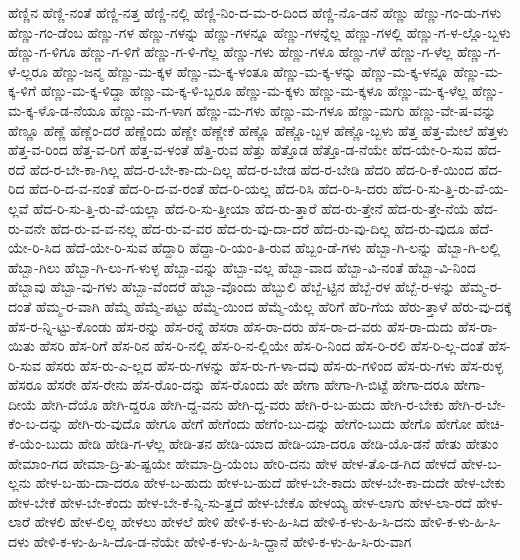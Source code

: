 {ಹೆಣ್ಣಿನ
ಹೆಣ್ಣಿ-ನಂತೆ
ಹೆಣ್ಣಿ-ನತ್ತ
ಹೆಣ್ಣಿ-ನಲ್ಲಿ
ಹೆಣ್ಣಿ-ನಿಂ-ದ-ಮ-ರ-ದಿಂದ
ಹೆಣ್ಣಿ-ನೊ-ಡನೆ
ಹೆಣ್ಣು
ಹೆಣ್ಣು-ಗಂ-ಡು-ಗಳು
ಹೆಣ್ಣು-ಗಂ-ಡೆಂಬ
ಹೆಣ್ಣು-ಗಳ
ಹೆಣ್ಣು-ಗಳನ್ನು
ಹೆಣ್ಣು-ಗಳನ್ನೂ
ಹೆಣ್ಣು-ಗಳನ್ನೆಲ್ಲ
ಹೆಣ್ಣು-ಗಳಲ್ಲಿ
ಹೆಣ್ಣು-ಗ-ಳ-ಲ್ಲೊ-ಬ್ಬಳು
ಹೆಣ್ಣು-ಗ-ಳಿಗೂ
ಹೆಣ್ಣು-ಗ-ಳಿಗೆ
ಹೆಣ್ಣು-ಗ-ಳಿ-ಗೆಲ್ಲ
ಹೆಣ್ಣು-ಗಳು
ಹೆಣ್ಣು-ಗಳೂ
ಹೆಣ್ಣು-ಗಳೆ
ಹೆಣ್ಣು-ಗ-ಳೆಲ್ಲ
ಹೆಣ್ಣು-ಗ-ಳೆ-ಲ್ಲರೂ
ಹೆಣ್ಣು-ಜನ್ಮ
ಹೆಣ್ಣು-ಮ-ಕ್ಕಳ
ಹೆಣ್ಣು-ಮ-ಕ್ಕ-ಳಂತೂ
ಹೆಣ್ಣು-ಮ-ಕ್ಕ-ಳನ್ನು
ಹೆಣ್ಣು-ಮ-ಕ್ಕ-ಳನ್ನೂ
ಹೆಣ್ಣು-ಮ-ಕ್ಕ-ಳಿಗೆ
ಹೆಣ್ಣು-ಮ-ಕ್ಕ-ಳಿದ್ದಾ
ಹೆಣ್ಣು-ಮ-ಕ್ಕ-ಳಿ-ಬ್ಬರೂ
ಹೆಣ್ಣು-ಮ-ಕ್ಕಳು
ಹೆಣ್ಣು-ಮ-ಕ್ಕಳೂ
ಹೆಣ್ಣು-ಮ-ಕ್ಕ-ಳೆಲ್ಲ
ಹೆಣ್ಣು-ಮ-ಕ್ಕ-ಳೊ-ಡ-ನೆಯೂ
ಹೆಣ್ಣು-ಮ-ಗ-ಳಾಗ
ಹೆಣ್ಣು-ಮ-ಗಳು
ಹೆಣ್ಣು-ಮ-ಗಳೂ
ಹೆಣ್ಣು-ಮಗು
ಹೆಣ್ಣು-ವೇ-ಷ-ವನ್ನು
ಹೆಣ್ಣೂ
ಹೆಣ್ಣೆ
ಹೆಣ್ಣೆಂ-ದರೆ
ಹೆಣ್ಣೆಂದು
ಹೆಣ್ಣೇ
ಹೆಣ್ಣೇಕೆ
ಹೆಣ್ಣೊ
ಹೆಣ್ಣೊ-ಬ್ಬಳ
ಹೆಣ್ಣೊ-ಬ್ಬಳು
ಹೆತ್ತ
ಹೆತ್ತ-ಮೇಲೆ
ಹೆತ್ತಳು
ಹೆತ್ತ-ವ-ರಿಂದ
ಹೆತ್ತ-ವ-ರಿಗೆ
ಹೆತ್ತ-ವ-ಳಂತೆ
ಹೆತ್ತಿ-ರುವ
ಹೆತ್ತು
ಹೆತ್ತೊಡ
ಹೆತ್ತೊ-ಡ-ನೆಯೇ
ಹೆದ-ಯೇ-ರಿ-ಸುವ
ಹೆದ-ರದೆ
ಹೆದ-ರ-ಬೇ-ಕಾ-ಗಿಲ್ಲ
ಹೆದ-ರ-ಬೇ-ಕಾ-ದು-ದಿಲ್ಲ
ಹೆದ-ರ-ಬೇಡ
ಹೆದ-ರ-ಬೇಡಿ
ಹೆದರಿ
ಹೆದ-ರಿ-ಕೆ-ಯಿಂದ
ಹೆದ-ರಿದ
ಹೆದ-ರಿ-ದ-ವ-ನಂತೆ
ಹೆದ-ರಿ-ದ-ವ-ರಂತೆ
ಹೆದ-ರಿ-ಯಲ್ಲ
ಹೆದ-ರಿಸಿ
ಹೆದ-ರಿ-ಸಿ-ದರು
ಹೆದ-ರಿ-ಸು-ತ್ತಿ-ರು-ವೆ-ಯ-ಲ್ಲವೆ
ಹೆದ-ರಿ-ಸು-ತ್ತಿ-ರು-ವೆ-ಯಲ್ಲಾ
ಹೆದ-ರಿ-ಸು-ತ್ತೀಯಾ
ಹೆದ-ರು-ತ್ತಾರೆ
ಹೆದ-ರು-ತ್ತೇನೆ
ಹೆದ-ರು-ತ್ತೇ-ನೆಯೆ
ಹೆದ-ರು-ವನೇ
ಹೆದ-ರು-ವ-ವ-ನಲ್ಲ
ಹೆದ-ರು-ವ-ವರ
ಹೆದ-ರು-ವು-ದಾ-ದರೆ
ಹೆದ-ರು-ವು-ದಿಲ್ಲ
ಹೆದ-ರು-ವುದೂ
ಹೆದೆ-ಯೇ-ರಿ-ಸಿದ
ಹೆದೆ-ಯೇ-ರಿ-ಸುವ
ಹೆದ್ದಾರಿ
ಹೆದ್ದಾ-ರಿ-ಯಂ-ತಿ-ರುವ
ಹೆಬ್ಬಂ-ಡೆ-ಗಳು
ಹೆಬ್ಬಾ-ಗಿ-ಲನ್ನು
ಹೆಬ್ಬಾ-ಗಿ-ಲಲ್ಲಿ
ಹೆಬ್ಬಾ-ಗಿಲು
ಹೆಬ್ಬಾ-ಗಿ-ಲು-ಗ-ಳುಳ್ಳ
ಹೆಬ್ಬಾ-ವನ್ನು
ಹೆಬ್ಬಾ-ವಲ್ಲ
ಹೆಬ್ಬಾ-ವಾದ
ಹೆಬ್ಬಾ-ವಿ-ನಂತೆ
ಹೆಬ್ಬಾ-ವಿ-ನಿಂದ
ಹೆಬ್ಬಾವು
ಹೆಬ್ಬಾ-ವು-ಗಳು
ಹೆಬ್ಬಾ-ವೆಂದರೆ
ಹೆಬ್ಬಾ-ವೊಂದು
ಹೆಬ್ಬುಲಿ
ಹೆಬ್ಬೆ-ಟ್ಟಿನ
ಹೆಬ್ಬೆ-ರಳ
ಹೆಬ್ಬೆ-ರ-ಳನ್ನು
ಹೆಮ್ಮ-ರ-ದಂತೆ
ಹೆಮ್ಮ-ರ-ವಾಗಿ
ಹೆಮ್ಮೆ
ಹೆಮ್ಮೆ-ಪಟ್ಟು
ಹೆಮ್ಮೆ-ಯಿಂದ
ಹೆಮ್ಮೆ-ಯೆಲ್ಲ
ಹೆರಿಗೆ
ಹೆರಿ-ಗೆಯ
ಹೆರು-ತ್ತಾಳೆ
ಹೆರು-ವು-ದಕ್ಕೆ
ಹೆಸ-ರ-ನ್ನಿ-ಟ್ಟು-ಕೊಂಡು
ಹೆಸ-ರನ್ನು
ಹೆಸ-ರನ್ನೆ
ಹೆಸರಾ
ಹೆಸ-ರಾ-ದರು
ಹೆಸ-ರಾ-ದ-ವರು
ಹೆಸ-ರಾ-ದುದು
ಹೆಸ-ರಾ-ಯಿತು
ಹೆಸರಿ
ಹೆಸ-ರಿಗೆ
ಹೆಸ-ರಿನ
ಹೆಸ-ರಿ-ನಲ್ಲಿ
ಹೆಸ-ರಿ-ನ-ಲ್ಲಿಯೇ
ಹೆಸ-ರಿ-ನಿಂದ
ಹೆಸ-ರಿ-ರಲಿ
ಹೆಸ-ರಿ-ಲ್ಲ-ದಂತೆ
ಹೆಸ-ರಿ-ಸುವ
ಹೆಸರು
ಹೆಸ-ರು-ಎ-ಲ್ಲದ
ಹೆಸ-ರು-ಗಳನ್ನು
ಹೆಸ-ರು-ಗ-ಳಾ-ದವು
ಹೆಸ-ರು-ಗಳಿಂದ
ಹೆಸ-ರು-ಗಳು
ಹೆಸ-ರುಳ್ಳ
ಹೆಸರೂ
ಹೆಸರೇ
ಹೆಸ-ರೇನು
ಹೆಸ-ರೊಂ-ದನ್ನು
ಹೆಸ-ರೊಂದು
ಹೇ
ಹೇಗಾ
ಹೇಗಾ-ಗಿ-ಬಿಟ್ಟೆ
ಹೇಗಾ-ದರೂ
ಹೇಗಾ-ದೀಯೆ
ಹೇಗಿ-ದೆಯೊ
ಹೇಗಿ-ದ್ದರೂ
ಹೇಗಿ-ದ್ದ-ವನು
ಹೇಗಿ-ದ್ದ-ವರು
ಹೇಗಿ-ರ-ಬ-ಹುದು
ಹೇಗಿ-ರ-ಬೇಕು
ಹೇಗಿ-ರ-ಬೇ-ಕೆಂ-ಬ-ದನ್ನು
ಹೇಗಿ-ರು-ವುದೊ
ಹೇಗೂ
ಹೇಗೆ
ಹೇಗೆಂದು
ಹೇಗೆಂ-ಬು-ದನ್ನು
ಹೇಗೆಂ-ಬುದು
ಹೇಗೊ
ಹೇಗೋ
ಹೇಚಿ-ಕೆ-ಯೆಂ-ಬುದು
ಹೇಡಿ
ಹೇಡಿ-ಗ-ಳೆಲ್ಲ
ಹೇಡಿ-ತನ
ಹೇಡಿ-ಯಾದ
ಹೇಡಿ-ಯಾ-ದರೂ
ಹೇಡಿ-ಯೊ-ಡನೆ
ಹೇತು
ಹೇತುಂ
ಹೇಮಾಂ-ಗದ
ಹೇಮಾ-ದ್ರಿ-ತು-ಷ್ಟಯೇ
ಹೇಮಾ-ದ್ರಿ-ಯೆಂಬ
ಹೇರಿ-ದನು
ಹೇಳ
ಹೇಳ-ತೊ-ಡ-ಗಿದ
ಹೇಳದೆ
ಹೇಳ-ಬ-ಲ್ಲನು
ಹೇಳ-ಬ-ಹು-ದಾ-ದರೂ
ಹೇಳ-ಬ-ಹುದು
ಹೇಳ-ಬ-ಹುದೆ
ಹೇಳ-ಬೇ-ಕಾದು
ಹೇಳ-ಬೇ-ಕಾ-ದುದೇ
ಹೇಳ-ಬೇಕು
ಹೇಳ-ಬೇಕೆ
ಹೇಳ-ಬೇ-ಕೆಂದು
ಹೇಳ-ಬೇ-ಕೆ-ನ್ನಿ-ಸು-ತ್ತದೆ
ಹೇಳ-ಬೇಕೊ
ಹೇಳಯ್ಯ
ಹೇಳ-ಲಾಗು
ಹೇಳ-ಲಾ-ರದೆ
ಹೇಳ-ಲಾರೆ
ಹೇಳಲಿ
ಹೇಳ-ಲಿಲ್ಲ
ಹೇಳಲು
ಹೇಳಲೆ
ಹೇಳಿ
ಹೇಳಿ-ಕ-ಳು-ಹಿ-ಸಿದ
ಹೇಳಿ-ಕ-ಳು-ಹಿ-ಸಿ-ದನು
ಹೇಳಿ-ಕ-ಳು-ಹಿ-ಸಿ-ದಳು
ಹೇಳಿ-ಕ-ಳು-ಹಿ-ಸಿ-ದೊ-ಡ-ನೆಯೇ
ಹೇಳಿ-ಕ-ಳು-ಹಿ-ಸಿ-ದ್ದಾನೆ
ಹೇಳಿ-ಕ-ಳು-ಹಿ-ಸಿ-ರು-ವಾಗ
}
